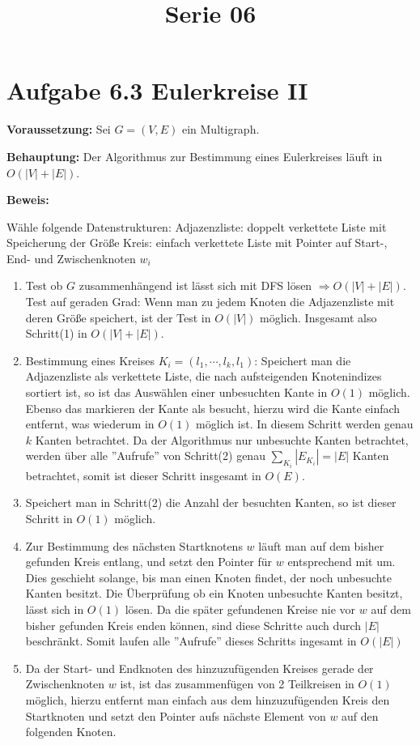  
\title{Serie 06}

 

  \section*{Aufgabe 6.3 Eulerkreise II}
  
  \textbf{Voraussetzung: } Sei $G=(V,E)$ ein Multigraph.
  
  \noindent
  \textbf{Behauptung: } Der Algorithmus zur Bestimmung eines Eulerkreises läuft in $O(|V| + |E|)$.

  \noindent
  \textbf{Beweis: }
  
  Wähle folgende Datenstrukturen:
  Adjazenzliste: doppelt verkettete Liste mit Speicherung der Größe
  Kreis: einfach verkettete Liste mit Pointer auf Start-, End- und Zwischenknoten $w_i$
  
  \begin{enumerate}
    \item Test ob $G$ zusammenhängend ist lässt sich mit DFS lösen $\Rightarrow O(|V| + |E|)$.\\
          Test auf geraden Grad: Wenn man zu jedem Knoten die Adjazenzliste mit deren Größe speichert, ist der Test in $O(|V|)$ möglich. Insgesamt also Schritt(1) in $O(|V| + |E|)$.
    \item Bestimmung eines Kreises $K_i = (l_1, \cdots, l_k, l_1)$: Speichert man die Adjazenzliste als verkettete Liste, die nach aufsteigenden Knotenindizes sortiert ist, so ist das Auswählen einer unbesuchten Kante in $O(1)$ möglich. Ebenso das markieren der Kante als besucht, hierzu wird die Kante einfach entfernt, was wiederum in $O(1)$ möglich ist. In diesem Schritt werden genau $k$ Kanten betrachtet. Da der Algorithmus nur unbesuchte Kanten betrachtet, werden über alle ''Aufrufe'' von Schritt(2) genau $\sum_{K_i} |E_{K_i}| = |E|$ Kanten betrachtet, somit ist dieser Schritt insgesamt in $O(E)$.
    \item Speichert man in Schritt(2) die Anzahl der besuchten Kanten, so ist dieser Schritt in $O(1)$ möglich.
    \item Zur Bestimmung des nächsten Startknotens $w$ läuft man auf dem bisher gefunden Kreis entlang, und setzt den Pointer für $w$ entsprechend mit um. Dies geschieht solange, bis man einen Knoten findet, der noch unbesuchte Kanten besitzt. Die Überprüfung ob ein Knoten unbesuchte Kanten besitzt, lässt sich in $O(1)$ lösen. Da die später gefundenen Kreise nie vor $w$ auf dem bisher gefunden Kreis enden können, sind diese Schritte auch durch $|E|$ beschränkt. Somit laufen alle ''Aufrufe'' dieses Schritts ingesamt in $O(|E|)$
    \item Da der Start- und Endknoten des hinzuzufügenden Kreises gerade der Zwischenknoten $w$ ist, ist das zusammenfügen von 2 Teilkreisen in $O(1)$ möglich, hierzu entfernt man einfach aus dem hinzuzufügenden Kreis den Startknoten und setzt den Pointer aufs nächste Element von $w$ auf den folgenden Knoten.
  \end{enumerate}
  
